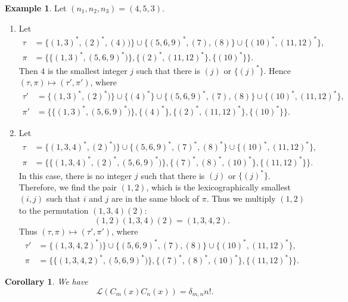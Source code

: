 \documentclass[oneside]{book}
\numberwithin{equation}{section}
\newtheorem{cor}[thm]{Corollary}
\theoremstyle{definition}
\newtheorem{exam}[thm]{Example}
\newcommand\LL{\mathcal{L}}
\begin{document}
\begin{exam}
  Let \( (n_1,n_2,n_3) = (4,5,3) \).
 \begin{enumerate}
 \item Let 
   \begin{align*}
     \tau &= \{ (1,3)^*, (2)^*, (4))\}\cup \{(5,6,9)^*, (7), (8)\}\cup \{ (10)^*, (11,12)^*\},\\
     \pi &= \bigg\{ \{ (1,3)^*, (5,6,9)^*)\}, \{(2)^*,(11,12)^*\}, \{(10)^*\} \bigg\}.
   \end{align*}
   Then \( 4 \) is the smallest integer \( j \) such that there is
   \( (j) \) or \( \{(j)^*\} \). Hence
   \( (\tau,\pi) \mapsto (\tau',\pi') \), where
   \begin{align*}
     \tau' &= \{ (1,3)^*, (2)^*)\}\cup \{(4)^*\}\cup \{(5,6,9)^*, (7), (8)\}\cup \{ (10)^*, (11,12)^*\},\\
     \pi' &= \bigg\{ \{ (1,3)^*, (5,6,9)^*)\},\{(4)^*\}, \{(2)^*,(11,12)^*\}, \{(10)^*\} \bigg\}.
   \end{align*}

 \item Let 
   \begin{align*}
     \tau &= \{ (1,3,4)^*, (2)^*)\}\cup \{(5,6,9)^*, (7)^*, (8)^*\}\cup \{ (10)^*, (11,12)^*\},\\
     \pi &= \bigg\{ \{ (1,3,4)^*,(2)^*, (5,6,9)^*)\}, \{ (7)^*, (8)^*, (10)^*\},\{(11,12)^*\} \bigg\}.
   \end{align*}
   In this case, there is no integer \( j \) such that there is
   \( (j) \) or \( \{(j)^*\} \). Therefore, we find the pair
   \( (1,2) \), which is the lexicographically smallest \( (i,j) \)
   such that \( i \) and \( j \) are in the same block of \( \pi \).
   Thus we multiply \( (1,2) \) to the permutation \( (1,3,4)(2) \):
   \[
     (1,2)(1,3,4)(2) = (1,3,4,2).
   \]
   Thus \( (\tau,\pi) \mapsto (\tau',\pi') \), where
   \begin{align*}
     \tau' &= \{ (1,3,4,2)^*)\}\cup \{(5,6,9)^*, (7), (8)\}\cup \{ (10)^*, (11,12)^*\},\\
     \pi &= \bigg\{ \{ (1,3,4,2)^*, (5,6,9)^*)\}, \{ (7)^*, (8)^*, (10)^*\},\{(11,12)^*\} \bigg\}.
   \end{align*}
 \end{enumerate}
 
\end{exam}



\begin{cor}
  We have
  \[
  \LL(C_{m}(x)C_{n}(x)) = \delta_{m,n} n!.
\]
\end{cor}
\end{document}
